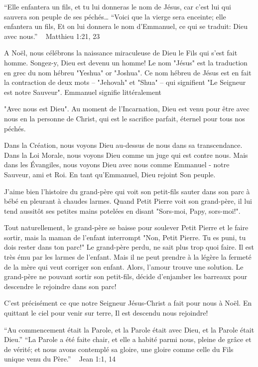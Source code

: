 

“Elle enfantera un fils, et tu lui donneras le nom de Jésus, car c’est lui qui sauvera son peuple de ses péchés… “Voici que la vierge sera enceinte; elle enfantera un fils, Et on lui donnera le nom d’Emmanuel, ce qui se traduit: Dieu avec nous.”
                                                  ~ Matthieu 1:21, 23

A Noël, nous célébrons la naissance miraculeuse de Dieu le Fils qui s'est fait homme. Songez-y, Dieu est devenu un homme! Le nom "Jésus" est la traduction en grec du nom hébreu "Yeshua" or "Joshua". Ce nom hébreu de Jésus est en fait la contraction de deux mots – "Jehovah" et "Shua" – qui signifient "Le Seigneur est notre Sauveur". Emmanuel signifie littéralement

"Avec nous est Dieu". Au moment de l'Incarnation, Dieu est venu pour être avec nous en la personne de Christ, qui est le sacrifice parfait, éternel pour tous nos péchés.

Dans la Création, nous voyons Dieu au-dessus de nous dans sa transcendance. Dans la Loi Morale, nous voyons Dieu comme un juge qui est contre nous. Mais dans les Évangiles, nous voyons Dieu avec nous comme Emmanuel - notre Sauveur, ami et Roi. En tant qu'Emmanuel, Dieu rejoint Son peuple.

J'aime bien l'histoire du grand-père qui voit son petit-fils sauter dans son parc à bébé en pleurant à chaudes larmes. Quand Petit Pierre voit son grand-père, il lui tend aussitôt ses petites mains potelées en disant "Sors-moi, Papy, sors-moi!".

Tout naturellement, le grand-père se baisse pour soulever Petit Pierre et le faire sortir, mais la maman de l'enfant interrompt "Non, Petit Pierre. Tu es puni, tu dois rester dans ton parc!" Le grand-père perdu, ne sait plus trop quoi faire. Il est très ému par les larmes de l'enfant. Mais il ne peut prendre à la légère la fermeté de la mère qui veut corriger son enfant. Alors, l'amour trouve une solution. Le grand-père ne pouvant sortir son petit-fils, décide d'enjamber les barreaux pour descendre le rejoindre dans son parc!

C'est précisément ce que notre Seigneur Jésus-Christ a fait pour nous à Noël. En quittant le ciel pour venir sur terre, Il est descendu nous rejoindre!


“Au commencement était la Parole, et la Parole était avec Dieu, et la Parole était Dieu.” “La Parole a été faite chair, et elle a habité parmi nous, pleine de grâce et de vérité; et nous avons contemplé sa gloire, une gloire comme celle du Fils unique venu du Père.” ~ Jean 1:1, 14 

